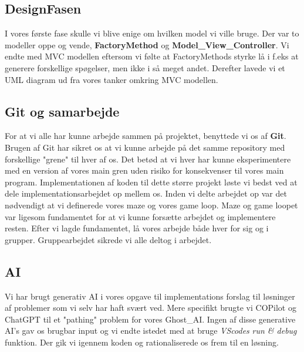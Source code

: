 \documentclass{article}
\theoremstyle{mytheoremstyle}
\theoremstyle{mytheoremstyle}
\theoremstyle{myproblemstyle}
\begin{document}
\subsection{DesignFasen}
I vores første fase skulle vi blive enige om hvilken model vi ville bruge. Der var to modeller oppe og vende, 
\textbf{FactoryMethod} og \textbf{Model\_View\_Controller}. 
Vi endte med MVC modellen eftersom vi følte at FactoryMethods styrke lå i f.eks at generere forskellige spøgelser, 
men ikke i så meget andet. Derefter lavede vi et UML diagram ud fra vores tanker omkring MVC modellen.


\subsection{Git og samarbejde}
For at vi alle har kunne arbejde sammen på projektet, benyttede vi os af \textbf{Git}. 
Brugen af Git har sikret os at vi kunne arbejde på det samme repository med forskellige "grene" til hver af os.
Det betød at vi hver har kunne eksperimentere med en version af vores main gren uden risiko for konsekvenser til vores main program. 
Implementationen af koden til dette større projekt løste vi bedst ved at dele implementationsarbejdet op mellem os.
Inden vi delte arbejdet op var det nødvendigt at vi definerede vores maze og vores game loop.
Maze og game loopet var ligesom fundamentet for at vi kunne forsætte arbejdet og implementere resten.
Efter vi lagde fundamentet, lå vores arbejde både hver for sig og i grupper.
Gruppearbejdet sikrede vi alle deltog i arbejdet.

\subsection{AI}
Vi har brugt generativ AI i vores opgave til implementations forslag til løsninger af problemer som vi selv har haft svært ved. 
Mere specifikt brugte vi COPilot og ChatGPT til et "pathing" problem for vores Ghost\_AI. 
Ingen af disse generative AI's gav os brugbar input og vi endte istedet med at bruge \textit{VScodes} \textit{run \& debug} funktion. 
Der gik vi igennem koden og rationaliserede os frem til en løsning.

\end{document}
